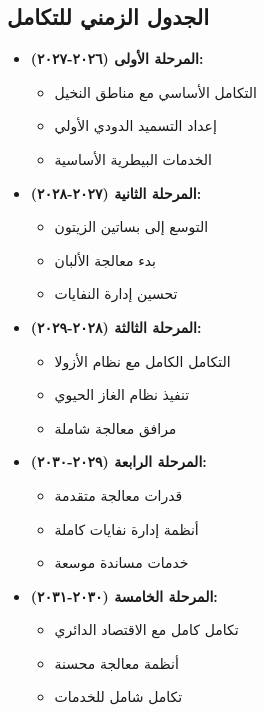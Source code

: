 \subsection{الجدول الزمني للتكامل}
\begin{itemize}
    \item \textbf{المرحلة الأولى (٢٠٢٦-٢٠٢٧):}
    \begin{itemize}
        \item التكامل الأساسي مع مناطق النخيل
        \item إعداد التسميد الدودي الأولي
        \item الخدمات البيطرية الأساسية
    \end{itemize}
    
    \item \textbf{المرحلة الثانية (٢٠٢٧-٢٠٢٨):}
    \begin{itemize}
        \item التوسع إلى بساتين الزيتون
        \item بدء معالجة الألبان
        \item تحسين إدارة النفايات
    \end{itemize}
    
    \item \textbf{المرحلة الثالثة (٢٠٢٨-٢٠٢٩):}
    \begin{itemize}
        \item التكامل الكامل مع نظام الأزولا
        \item تنفيذ نظام الغاز الحيوي
        \item مرافق معالجة شاملة
    \end{itemize}
    
    \item \textbf{المرحلة الرابعة (٢٠٢٩-٢٠٣٠):}
    \begin{itemize}
        \item قدرات معالجة متقدمة
        \item أنظمة إدارة نفايات كاملة
        \item خدمات مساندة موسعة
    \end{itemize}
    
    \item \textbf{المرحلة الخامسة (٢٠٣٠-٢٠٣١):}
    \begin{itemize}
        \item تكامل كامل مع الاقتصاد الدائري
        \item أنظمة معالجة محسنة
        \item تكامل شامل للخدمات
    \end{itemize}
\end{itemize}
